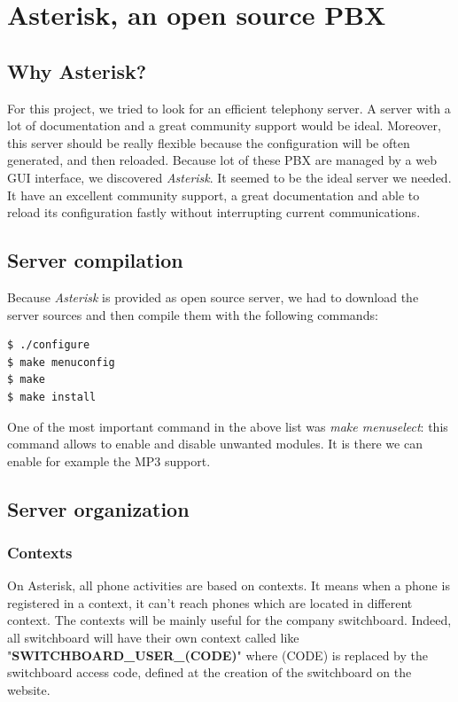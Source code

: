 \chapter{Asterisk, an open source PBX}

\section{Why Asterisk?}
For this project, we tried to look for an efficient telephony server. A server with a lot of documentation and a great community support would be ideal. Moreover, this server should be really flexible because the configuration will be often generated, and then reloaded.
Because lot of these PBX are managed by a web GUI interface, we discovered \textit{Asterisk}. It seemed to be the ideal server we needed. It have an excellent community support, a great documentation and able to reload its configuration fastly without interrupting current communications.

\section{Server compilation}
Because \textit{Asterisk} is provided as open source server, we had to download the server sources and then compile them with the following commands:
\begin{lstlisting}[language=bash,caption={bash}]
$ ./configure
$ make menuconfig
$ make
$ make install
\end{lstlisting}

One of the most important command in the above list was \textit{make menuselect}: this command allows to enable and disable unwanted modules. It is there we can enable for example the MP3 support.

\section{Server organization}

\subsection{Contexts}
On Asterisk, all phone activities are based on contexts. It means when a phone is registered in a context, it can't reach phones which are located in different context. The contexts will be mainly useful for the company switchboard. Indeed, all switchboard will have their own context called like "\textbf{SWITCHBOARD\_USER\_(CODE)}" where (CODE) is replaced by the switchboard access code, defined at the creation of the switchboard on the website.


